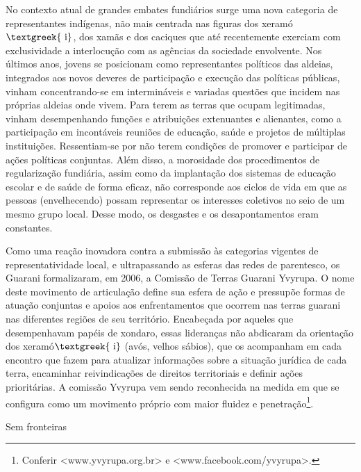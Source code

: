 \documentclass{article}
\begin{document}
No contexto atual de grandes embates fundi\'arios surge uma nova
categoria de representantes ind\'igenas, n\~ao mais centrada nas
figuras dos xeram\'o$\text{\textgreek{~i}}$, dos xam\~as e dos caciques
que at\'e recentemente exerciam com exclusividade a interlocu\c{c}\~ao
com as ag\^encias da sociedade envolvente. Nos \'ultimos anos, jovens
se posicionam como representantes pol\'iticos das aldeias, integrados
aos novos deveres de participa\c{c}\~ao e execu\c{c}\~ao das
pol\'iticas p\'ublicas, vinham concentrando-se em intermin\'aveis e
variadas quest\~oes que incidem nas pr\'oprias aldeias onde vivem. Para
terem as terras que ocupam legitimadas, vinham desempenhando
fun\c{c}\~oes e atribui\c{c}\~oes extenuantes e alienantes, como a
participa\c{c}\~ao em incont\'aveis reuni\~oes de educa\c{c}\~ao,
sa\'ude e projetos de m\'ultiplas institui\c{c}\~oes. Ressentiam-se por
n\~ao terem condi\c{c}\~oes de promover e participar de a\c{c}\~oes
pol\'iticas conjuntas. Al\'em disso, a morosidade dos procedimentos de
regulariza\c{c}\~ao fundi\'aria, assim como da implanta\c{c}\~ao dos
sistemas de educa\c{c}\~ao escolar e de sa\'ude de forma eficaz, n\~ao
corresponde aos ciclos de vida em que as pessoas (envelhecendo) possam
representar os interesses coletivos no seio de um mesmo grupo local.
Desse modo, os desgastes e os desapontamentos eram constantes.  

Como uma rea\c{c}\~ao inovadora contra a submiss\~ao \`as categorias
vigentes de representatividade local, e ultrapassando as esferas das
redes de parentesco, os Guarani formalizaram, em 2006, a Comiss\~ao de
Terras Guarani Yvyrupa.  O nome deste movimento de articula\c{c}\~ao
define sua esfera de a\c{c}\~ao e pressup\~oe formas de atua\c{c}\~ao
conjuntas e apoios aos enfrentamentos que ocorrem nas terras guarani
nas diferentes regi\~oes de seu territ\'orio. Encabe\c{c}ada por
aqueles que desempenhavam pap\'eis de xondaro, essas lideran\c{c}as
n\~ao abdicaram da orienta\c{c}\~ao dos xeram\'o$\text{\textgreek{~i}}$
(av\'os, velhos s\'abios), que os acompanham em cada encontro que fazem
para atualizar informa\c{c}\~oes sobre a situa\c{c}\~ao jur\'idica de
cada terra, encaminhar reivindica\c{c}\~oes de direitos territoriais e
definir a\c{c}\~oes priorit\'arias. A comiss\~ao Yvyrupa vem sendo
reconhecida na medida em que se configura como um movimento pr\'oprio
com maior fluidez e penetra\c{c}\~ao\footnote{ Conferir
{\textless}www.yvyrupa.org.br{\textgreater} e
{\textless}www.facebook.com/yvyrupa{\textgreater}.}. 

Sem fronteiras
\end{document}
